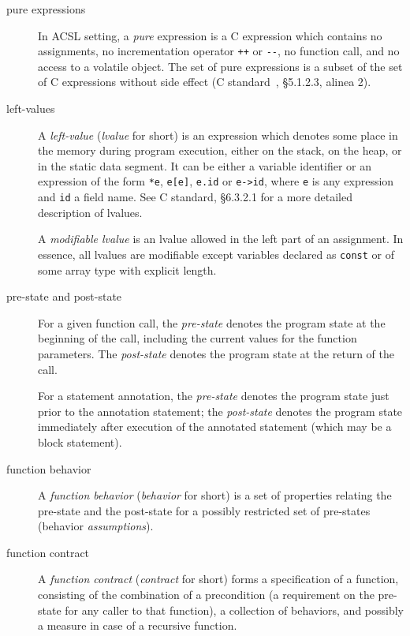 \documentclass[web]{frama-c-book}
\begin{document}
\begin{description}
\item[pure expressions]  In ACSL setting, a
  \emph{pure} expression is a C expression which contains no assignments, no
  incrementation operator \lstinline|++| or \lstinline|--|, no function call,
  and no access to a volatile object. The set of pure expressions is a
  subset of the set of C expressions without side effect (C
  standard~\cite{KR88,standardc99}, \S 5.1.2.3, alinea 2).

\item[left-values] 

  A \emph{left-value} (\emph{lvalue} for short) is an expression which
  denotes some place in the memory during program execution, either on
  the stack, on the heap, or in the static data segment. It can be
  either a variable identifier or an expression of the form \lstinline|*e|,
  \lstinline|e[e]|, \lstinline|e.id| or \lstinline|e->id|, where
  \lstinline |e| is any expression and \lstinline|id| a field name.
  See C standard, \S 6.3.2.1 for a more
  detailed description of lvalues.

  A \emph{modifiable lvalue} is an lvalue allowed in the left part of
  an assignment. In essence, all lvalues are modifiable except
  variables declared as \texttt{const} or of some array type with
  explicit length.

\item[pre-state and post-state]

    For a given function call, the \emph{pre-state} denotes the
    program state at the beginning of the call, including the
    current values for the function parameters. The \emph{post-state}
    denotes the program state at the return of the call.
    
    For a statement annotation, the \emph{pre-state} denotes the
    program state just prior to the annotation statement; the
    \emph{post-state}
    denotes the program state immediately after execution of the annotated statement (which may be a block statement).  

\item[function behavior]  

  A \emph{function behavior} (\emph{behavior} for short) is a set of
  properties relating the pre-state and the post-state for a
  possibly restricted set of pre-states (behavior \emph{assumptions}).

\item[function contract]  

  A \emph{function contract} (\emph{contract} for short) forms a
  specification of a function, consisting of the combination of a
  precondition (a requirement on the pre-state for any caller to that
  function), a collection of behaviors, and possibly a measure in case
  of a recursive function.

\end{description}
\end{document}
